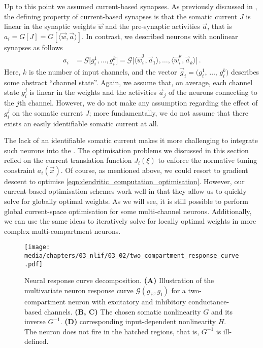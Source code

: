 Up to this point we assumed current-based synapses.
As previously discussed in , the defining property of current-based synapses is that the somatic current $J$ is linear in the synaptic weights $\vec w$ and the pre-synaptic activities $\vec a$, that is $a_i = G[J] = G[\langle \vec w, \vec a \rangle]$.
In contrast, we described neurons with nonlinear synapses as follows
\begin{align}
	a_i &=
	\mathscr{G} \bigl[
		g_i^1, \ldots, g_i^k
	\bigr] =
	\mathscr{G} \bigl[
		\langle \vec w_{i}^1, \vec a_1 \rangle,
		\ldots ,
		\langle \vec w_{i}^k, \vec a_k \rangle
	\bigr] \,.
	\label{eqn:def_response_curve_g}
\end{align}
Here, $k$ is the number of input channels, and the vector $\vec g_i = (g^1_i$, $\ldots$, $g^k_i)$ describes some abstract \enquote{channel state}.
Again, we assume that, on average, each channel state $g^j_i$ is linear in the weights and the activities $\vec a_j$ of the neurons connecting to the $j$th channel.
However, we do not make any assumption regarding the effect of $g^j_i$ on the somatic current $J$; more fundamentally, we do not assume that there exists an easily identifiable somatic current at all.

The lack of an identifiable somatic current makes it more challenging to integrate such neurons into the \NEF.
The optimisation problems we discussed in this section relied on the current translation function $J_i(\xi)$ to enforce the normative tuning constraint $a_i(\vec x)$.
Of course, as mentioned above, we could resort to gradient descent to optimise \cref{eqn:dendritic_computation_optimisation}.
However, our current-based optimisation schemes work well in that they allow us to quickly solve for globally optimal weights.
As we will see, it is still possible to perform global current-space optimisation for some multi-channel neurons.
Additionally, we can use the same ideas to iteratively solve for locally optimal weights in more complex multi-compartment neurons.

\begin{figure}
	\centering
	\texttt{[image: media/chapters/03\_nlif/03\_02/two\_compartment\_response\_curve.pdf]}
	\caption[Neural response curve decomposition]{Neural response curve decomposition. \textbf{(A)} Illustration of the multivariate neuron response curve $\mathscr{G}(g_\mathrm{E}, g_\mathrm{I})$ for a two-compartment \LIF neuron with excitatory and inhibitory conductance-based channels. \textbf{(B, C)} The chosen somatic nonlinearity $G$ and its inverse $G^{-1}$. \textbf{(D)} corresponding input-dependent nonlinearity $H$. The neuron does not fire in the hatched regions, that is, $G^{-1}$ is ill-defined.} 
	\label{fig:two_compartment_response_curve}
\end{figure}

